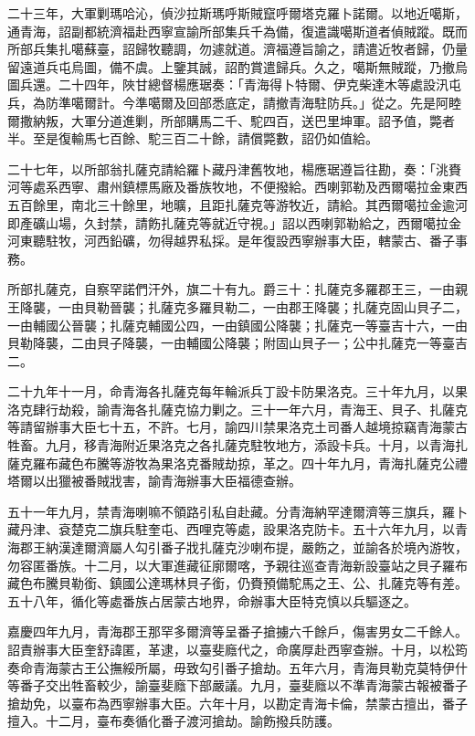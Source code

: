 \begin{pinyinscope}
二十三年，大軍剿瑪哈沁，偵沙拉斯瑪呼斯賊竄呼爾塔克羅卜諾爾。以地近噶斯，通青海，詔副都統濟福赴西寧宣諭所部集兵千為備，復遣識噶斯道者偵賊蹤。既而所部兵集扎噶蘇臺，詔歸牧聽調，勿遽就道。濟福遵旨諭之，請遣近牧者歸，仍量留遠道兵屯烏圖，備不虞。上鑒其誠，詔酌賞遣歸兵。久之，噶斯無賊蹤，乃撤烏圖兵還。二十四年，陜甘總督楊應琚奏：「青海得卜特爾、伊克柴達木等處設汛屯兵，為防準噶爾計。今準噶爾及回部悉底定，請撤青海駐防兵。」從之。先是阿睦爾撒納叛，大軍分道進剿，所部購馬二千、駝四百，送巴里坤軍。詔予值，斃者半。至是復輸馬七百餘、駝三百二十餘，請償斃數，詔仍如值給。

二十七年，以所部翁扎薩克請給羅卜藏丹津舊牧地，楊應琚遵旨往勘，奏：「洮賚河等處系西寧、肅州鎮標馬廠及番族牧地，不便撥給。西喇郭勒及西爾噶拉金東西五百餘里，南北三十餘里，地曠，且距扎薩克等游牧近，請給。其西爾噶拉金逾河即產礦山場，久封禁，請飭扎薩克等就近守視。」詔以西喇郭勒給之，西爾噶拉金河東聽駐牧，河西鉛礦，勿得越界私採。是年復設西寧辦事大臣，轄蒙古、番子事務。

所部扎薩克，自察罕諾們汗外，旗二十有九。爵三十：扎薩克多羅郡王三，一由親王降襲，一由貝勒晉襲；扎薩克多羅貝勒二，一由郡王降襲；扎薩克固山貝子二，一由輔國公晉襲；扎薩克輔國公四，一由鎮國公降襲；扎薩克一等臺吉十六，一由貝勒降襲，二由貝子降襲，一由輔國公降襲；附固山貝子一；公中扎薩克一等臺吉二。

二十九年十一月，命青海各扎薩克每年輪派兵丁設卡防果洛克。三十年九月，以果洛克肆行劫殺，諭青海各扎薩克協力剿之。三十一年六月，青海王、貝子、扎薩克等請留辦事大臣七十五，不許。七月，諭四川禁果洛克土司番人越境掠竊青海蒙古牲畜。九月，移青海附近果洛克之各扎薩克駐牧地方，添設卡兵。十月，以青海扎薩克羅布藏色布騰等游牧為果洛克番賊劫掠，革之。四十年九月，青海扎薩克公禮塔爾以出獵被番賊戕害，諭青海辦事大臣福德查辦。

五十一年九月，禁青海喇嘛不領路引私自赴藏。分青海納罕達爾濟等三旗兵，羅卜藏丹津、袞楚克二旗兵駐奎屯、西哩克等處，設果洛克防卡。五十六年九月，以青海郡王納漢達爾濟屬人勾引番子戕扎薩克沙喇布提，嚴飭之，並諭各於境內游牧，勿容匿番族。十二月，以大軍進藏征廓爾喀，予親往巡查青海新設臺站之貝子羅布藏色布騰貝勒銜、鎮國公達瑪林貝子銜，仍賚預備駝馬之王、公、扎薩克等有差。五十八年，循化等處番族占居蒙古地界，命辦事大臣特克慎以兵驅逐之。

嘉慶四年九月，青海郡王那罕多爾濟等呈番子搶擄六千餘戶，傷害男女二千餘人。詔責辦事大臣奎舒諱匿，革逮，以臺斐廕代之，命廣厚赴西寧查辦。十月，以松筠奏命青海蒙古王公撫綏所屬，毋致勾引番子搶劫。五年六月，青海貝勒克莫特伊什等番子交出牲畜較少，諭臺斐廕下部嚴議。九月，臺斐廕以不準青海蒙古報被番子搶劫免，以臺布為西寧辦事大臣。六年十月，以勘定青海卡倫，禁蒙古擅出，番子擅入。十二月，臺布奏循化番子渡河搶劫。諭飭撥兵防護。


\end{pinyinscope}
